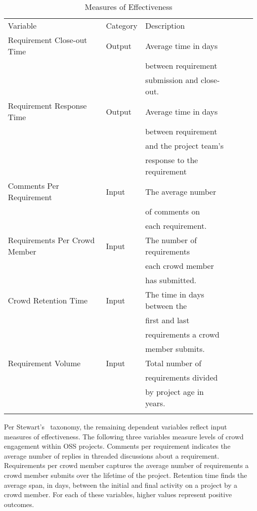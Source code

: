\begin{table}
\caption{Measures of Effectiveness}
\label{variable_table}
\begin{tabular}{llllll}
\hline\noalign{\smallskip}
Variable & Category & Description  \\
\noalign{\smallskip}\hline\noalign{\smallskip}
Requirement Close-out Time & Output & Average time in days \\ && between requirement \\
&& submission and close-out. \\
Requirement Response Time & Output & Average time in days \\  && between requirement \\
&& and the project team's \\ && response to the requirement\\
Comments Per Requirement & Input & The average number \\ && of comments on \\
&& each requirement. \\
Requirements Per Crowd Member & Input & The number of requirements \\
&& each crowd member \\ && has submitted.\\
Crowd Retention Time & Input & The time in days between the \\ 
&& first and last  \\ && requirements a crowd \\
&& member submits. \\
Requirement Volume & Input & Total number of \\ && requirements divided \\
&& by project age in years.\\
\noalign{\smallskip}\hline
\end{tabular}
\end{table}

Per Stewart's~\cite{stewart} taxonomy, the remaining dependent variables reflect input measures of effectiveness. The following three variables measure levels of crowd engagement within OSS projects. Comments per requirement indicates the average number of replies in threaded discussions about a requirement. Requirements per crowd member captures the average number of requirements a crowd member submits over the lifetime of the project. Retention time finds the average span, in days, between the initial and final activity on a project by a crowd member. For each of these variables, higher values represent positive outcomes.

